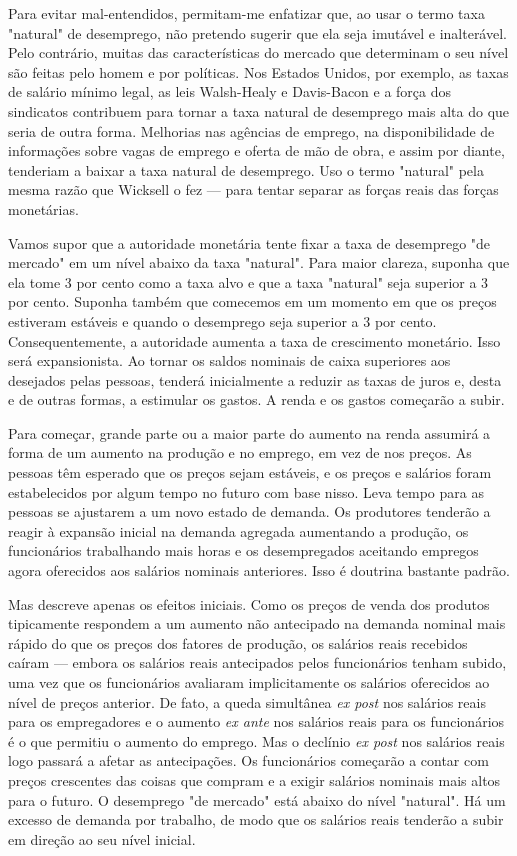 \documentclass[12pt]{article}
\begin{document}
Para evitar mal-entendidos, permitam-me enfatizar que, ao usar o termo taxa "natural" de desemprego, não pretendo sugerir que ela seja imutável e inalterável. Pelo contrário, muitas das características do mercado que determinam o seu nível são feitas pelo homem e por políticas. Nos Estados Unidos, por exemplo, as taxas de salário mínimo legal, as leis Walsh-Healy e Davis-Bacon e a força dos sindicatos contribuem para tornar a taxa natural de desemprego mais alta do que seria de outra forma. Melhorias nas agências de emprego, na disponibilidade de informações sobre vagas de emprego e oferta de mão de obra, e assim por diante, tenderiam a baixar a taxa natural de desemprego. Uso o termo "natural" pela mesma razão que Wicksell o fez — para tentar separar as forças reais das forças monetárias.

Vamos supor que a autoridade monetária tente fixar a taxa de desemprego "de mercado" em um nível abaixo da taxa "natural". Para maior clareza, suponha que ela tome 3 por cento como a taxa alvo e que a taxa "natural" seja superior a 3 por cento. Suponha também que comecemos em um momento em que os preços estiveram estáveis e quando o desemprego seja superior a 3 por cento. Consequentemente, a autoridade aumenta a taxa de crescimento monetário. Isso será expansionista. Ao tornar os saldos nominais de caixa superiores aos desejados pelas pessoas, tenderá inicialmente a reduzir as taxas de juros e, desta e de outras formas, a estimular os gastos. A renda e os gastos começarão a subir.

Para começar, grande parte ou a maior parte do aumento na renda assumirá a forma de um aumento na produção e no emprego, em vez de nos preços. As pessoas têm esperado que os preços sejam estáveis, e os preços e salários foram estabelecidos por algum tempo no futuro com base nisso. Leva tempo para as pessoas se ajustarem a um novo estado de demanda. Os produtores tenderão a reagir à expansão inicial na demanda agregada aumentando a produção, os funcionários trabalhando mais horas e os desempregados aceitando empregos agora oferecidos aos salários nominais anteriores. Isso é doutrina bastante padrão.

Mas descreve apenas os efeitos iniciais. Como os preços de venda dos produtos tipicamente respondem a um aumento não antecipado na demanda nominal mais rápido do que os preços dos fatores de produção, os salários reais recebidos caíram — embora os salários reais antecipados pelos funcionários tenham subido, uma vez que os funcionários avaliaram implicitamente os salários oferecidos ao nível de preços anterior. De fato, a queda simultânea \textit{ex post} nos salários reais para os empregadores e o aumento \textit{ex ante} nos salários reais para os funcionários é o que permitiu o aumento do emprego. Mas o declínio \textit{ex post} nos salários reais logo passará a afetar as antecipações. Os funcionários começarão a contar com preços crescentes das coisas que compram e a exigir salários nominais mais altos para o futuro. O desemprego "de mercado" está abaixo do nível "natural". Há um excesso de demanda por trabalho, de modo que os salários reais tenderão a subir em direção ao seu nível inicial.
\end{document}
